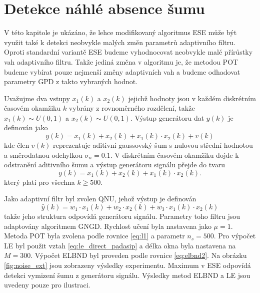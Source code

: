 \section{Detekce náhlé absence šumu}\label{chap:mdpi_noise_ext}
V této kapitole je ukázáno, že lehce modifikovaný algoritmus ESE může být využit také k detekci neobvykle malých změn parametrů adaptivního filtru. Oproti standardní variantě ESE budeme vyhodnocovat neobvykle malé přírůstky vah adaptivního filtru. Takže jediná změna v algoritmu je, že metodou POT budeme vybírat pouze nejmenší změny adaptivních vah a budeme odhadovat parametry GPD z takto vybraných hodnot.
\par
Uvažujme dva vstupy $x_1(k)$ a $x_2(k)$ jejichž hodnoty jsou v každém diskrétním časovém okamžiku $k$ vybrány z rovnoměrného rozdělení, takže  $x_1(k) \sim U(0,1)$ a $x_2(k)\sim U(0,1)$. Výstup generátoru dat $y(k)$ je definován jako
\begin{equation}
    y(k)=x_1(k)+x_2(k)+x_1(k)\cdot x_2(k)+v(k)
\end{equation}
kde člen $v(k)$ reprezentuje aditivní gaussovský šum s nulovou střední hodnotou a směrodatnou odchylkou $\sigma_n=0.1$. V diskrétním časovém okamžiku dojde k odstranění aditivního šumu a výstup generátoru signálu přejde do tvaru
\begin{equation}
    y(k)=x_1(k)+x_2(k)+x_1(k)\cdot x_2(k).
\end{equation}
který platí pro všechna $k\geq 500$.
\par 
Jako adaptivní filtr byl zvolen QNU, jehož výstup je definován
\begin{equation}
\hat{y}(k)=w_1\cdot x_1(k)+w_2\cdot x_2(k)+w_3\cdot x_1(k)\cdot x_2(k)
\end{equation}
takže jeho struktura odpovídá generátoru signálu. Parametry toho filtru jsou adaptovány algoritmem GNGD. Rychlost učení byla nastavena jako $\mu=1$. Metoda POT byla zvolena podle rovnice \ref{eq:l1} a parametr $n_s=500$.  Pro výpočet LE byl použit vztah \ref{eq:le_direct_padasip} a délka okna byla nastavena na $M=300$. Výpočet ELBND byl proveden podle rovnice \ref{eq:elbnd2}. Na obrázku \ref{fig:noise_ext} jsou zobrazeny výsledky experimentu. Maximum v ESE odpovídá detekci vymizení šumu z generátoru signálu. Výsledky metod ELBND a LE jsou uvedeny pouze pro ilustraci. 

